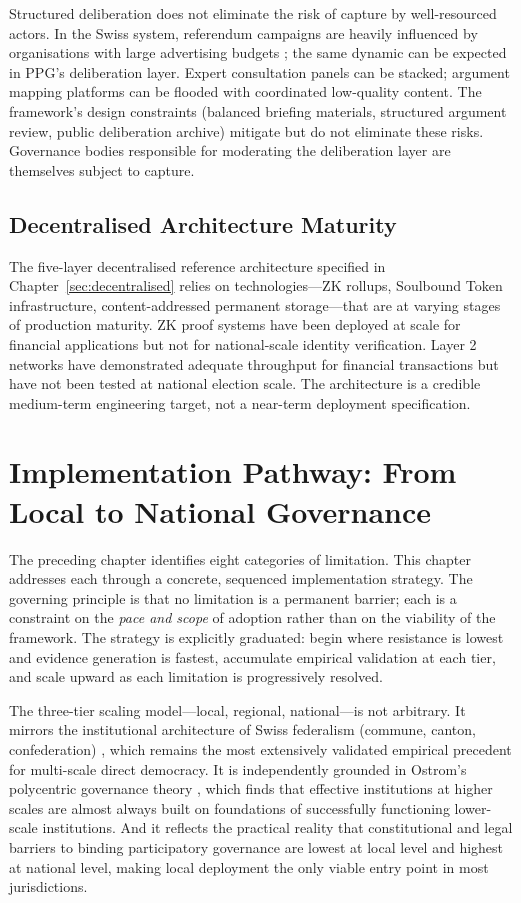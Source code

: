\documentclass[12pt,a4paper,oneside]{report}
\begin{document}
Structured deliberation does not eliminate the risk of capture by well-resourced actors. In the Swiss system, referendum campaigns are heavily influenced by organisations with large advertising budgets \citep{linder2010swiss}; the same dynamic can be expected in PPG's deliberation layer. Expert consultation panels can be stacked; argument mapping platforms can be flooded with coordinated low-quality content. The framework's design constraints (balanced briefing materials, structured argument review, public deliberation archive) mitigate but do not eliminate these risks. Governance bodies responsible for moderating the deliberation layer are themselves subject to capture.

\section{Decentralised Architecture Maturity}

The five-layer decentralised reference architecture specified in Chapter~\ref{sec:decentralised} relies on technologies---ZK rollups, Soulbound Token infrastructure, content-addressed permanent storage---that are at varying stages of production maturity. ZK proof systems have been deployed at scale for financial applications but not for national-scale identity verification. Layer 2 networks have demonstrated adequate throughput for financial transactions but have not been tested at national election scale. The architecture is a credible medium-term engineering target, not a near-term deployment specification.

\chapter{Implementation Pathway: From Local to National Governance}
\label{sec:pathway}

The preceding chapter identifies eight categories of limitation. This chapter addresses each through a concrete, sequenced implementation strategy. The governing principle is that no limitation is a permanent barrier; each is a constraint on the \emph{pace and scope} of adoption rather than on the viability of the framework. The strategy is explicitly graduated: begin where resistance is lowest and evidence generation is fastest, accumulate empirical validation at each tier, and scale upward as each limitation is progressively resolved.

The three-tier scaling model---local, regional, national---is not arbitrary. It mirrors the institutional architecture of Swiss federalism (commune, canton, confederation) \citep{linder2010swiss}, which remains the most extensively validated empirical precedent for multi-scale direct democracy. It is independently grounded in Ostrom's polycentric governance theory \citep{ostrom1990governing}, which finds that effective institutions at higher scales are almost always built on foundations of successfully functioning lower-scale institutions. And it reflects the practical reality that constitutional and legal barriers to binding participatory governance are lowest at local level and highest at national level, making local deployment the only viable entry point in most jurisdictions.
\end{document}
